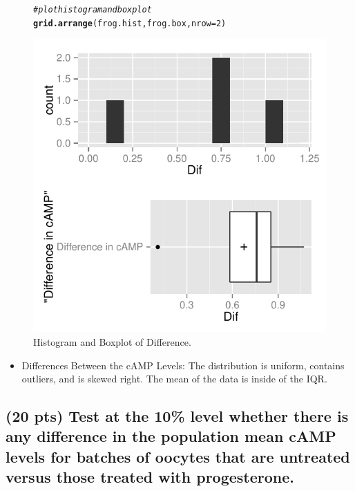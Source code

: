 \documentclass{article}\usepackage[]{graphicx}\usepackage[]{color}
\makeatletter
\def\maxwidth{ %
  \ifdim\Gin@nat@width>\linewidth
    \linewidth
  \else
    \Gin@nat@width
  \fi
}
\newcommand{\hlnum}[1]{\textcolor[rgb]{0.686,0.059,0.569}{#1}}%
\newcommand{\hlcom}[1]{\textcolor[rgb]{0.678,0.584,0.686}{\textit{#1}}}%
\newcommand{\hlstd}[1]{\textcolor[rgb]{0.345,0.345,0.345}{#1}}%
\newcommand{\hlkwc}[1]{\textcolor[rgb]{0.333,0.667,0.333}{#1}}%
\newcommand{\hlkwd}[1]{\textcolor[rgb]{0.737,0.353,0.396}{\textbf{#1}}}%
\newenvironment{kframe}{%
 \def\at@end@of@kframe{}%
 \ifinner\ifhmode%
  \def\at@end@of@kframe{\end{minipage}}%
  \begin{minipage}{\columnwidth}%
 \fi\fi%
 \def\FrameCommand##1{\hskip\@totalleftmargin \hskip-\fboxsep
 \colorbox{shadecolor}{##1}\hskip-\fboxsep
     \hskip-\linewidth \hskip-\@totalleftmargin \hskip\columnwidth}%
 \MakeFramed {\advance\hsize-\width
   \@totalleftmargin\z@ \linewidth\hsize
   \@setminipage}}%
 {\par\unskip\endMakeFramed%
 \at@end@of@kframe}
\newenvironment{knitrout}{}{} %
\makeatother
\begin{document}
\begin{figure}[H]  \begin{center}
\begin{knitrout}
\color{fgcolor}\begin{kframe}
\begin{alltt}
\hlcom{# plot histogram and boxplot}
\hlkwd{grid.arrange}\hlstd{(frog.hist, frog.box,} \hlkwc{nrow} \hlstd{=} \hlnum{2}\hlstd{)}
\end{alltt}
\end{kframe}
\includegraphics[width=\maxwidth]{figure/2_frog_boxplot} 

\end{knitrout}
\end{center} \caption{Histogram and Boxplot of Difference.} \end{figure}

\begin{itemize}
\item Differences Between the cAMP Levels:  The distribution is uniform, contains outliers, and is skewed right.  The mean of the data is inside of the IQR.
\end{itemize}

\subsection{(20 pts) Test at the 10\% level whether there is any difference in the population mean cAMP levels for batches of oocytes that are untreated versus those treated with progesterone.}
\end{document}
